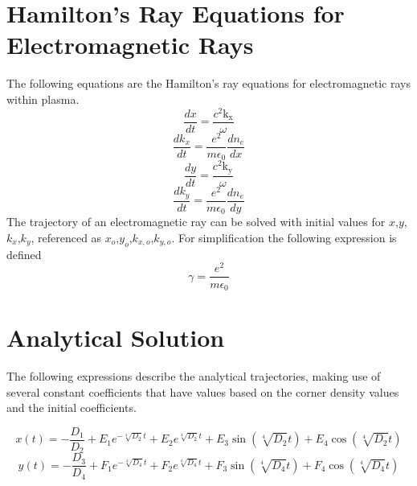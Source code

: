 \documentclass[11pt]{article}
\begin{document}
\section*{Hamilton's Ray Equations for Electromagnetic Rays}
The following equations are the Hamilton's ray equations for electromagnetic rays within plasma. 
\begin{equation}
\frac{dx}{d t}  = \frac{c^{2} \operatorname{k_{x}}}{\omega}
\tag{3}
\end{equation}
\begin{equation}
\frac{dk_x}{d t} = \frac{e^2 }{m \epsilon_0}\frac{dn_e}{dx}
\tag{4}
\end{equation}
\begin{equation}
\frac{dy}{d t}  = \frac{c^{2} \operatorname{k_{y}}{}}{\omega}
\tag{5}
\end{equation}
\begin{equation}
\frac{dk_y}{d t} = \frac{e^2 }{m \epsilon_0}\frac{dn_e}{dy}
\tag{6}
\end{equation}
The trajectory of an electromagnetic ray can be solved with initial values for $x$,$y$,$k_x$,$k_y$, referenced as $x_o$,$y_o$,$k_{x,o}$,$k_{y,o}$. For simplification the following expression is defined
$$\gamma = \frac{e^2}{m\epsilon_0}$$

\section*{Analytical Solution}
The following expressions describe the analytical trajectories, making use of several constant coefficients that have values based on the corner density values and the initial coefficients. 

\begin{equation}
x{\left(t \right)} = - \frac{D_{1}}{D_{2}} + E_{1} e^{- \sqrt[4]{D_{2}} t} + E_{2} e^{\sqrt[4]{D_{2}} t} + E_{3} \sin{\left(\sqrt[4]{D_{2}} t \right)} + E_{4} \cos{\left(\sqrt[4]{D_{2}} t \right)} \tag{7}
\end{equation}
\begin{equation}
y{\left(t \right)} = - \frac{D_{3}}{D_{4}} + F_{1} e^{- \sqrt[4]{D_{4}} t} + F_{2} e^{\sqrt[4]{D_{4}} t} + F_{3} \sin{\left(\sqrt[4]{D_{4}} t \right)} + F_{4} \cos{\left(\sqrt[4]{D_{4}} t \right)}
\tag{8}
\end{equation}
\end{document}

